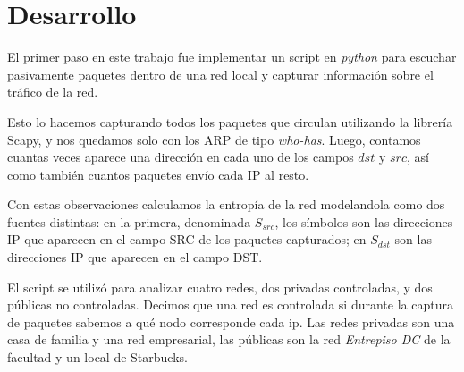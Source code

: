 \section{Desarrollo}

El primer paso en este trabajo fue implementar un script en \emph{python} 
para escuchar pasivamente paquetes dentro de una red local y capturar 
informaci\'on sobre el tr\'afico de la red.

Esto lo hacemos capturando todos los paquetes que circulan utilizando la 
librería Scapy, y nos quedamos solo con los ARP de tipo \emph{who-has}. 
Luego, contamos cuantas veces aparece una direcci\'on en cada uno de los 
campos $dst$ y $src$, as\'i como tambi\'en cuantos paquetes env\'io cada
IP al resto. 

Con estas observaciones calculamos la entrop\'ia de la red
modelandola como dos fuentes distintas: en la primera, denominada 
\textbf{$S_{src}$}, los símbolos son las direcciones IP que aparecen en
el campo SRC de los paquetes capturados; en \textbf{$S_{dst}$} son las
direcciones IP que aparecen en el campo DST.

El script se utiliz\'o para analizar cuatro redes, dos privadas controladas, y
dos p\'ublicas no controladas. Decimos que una red es controlada si durante 
la captura de paquetes sabemos a qu\'e nodo corresponde cada ip. Las redes 
privadas son una casa de familia y una red empresarial, las p\'ublicas son la
red \textit{Entrepiso DC} de la facultad y un local de Starbucks.
